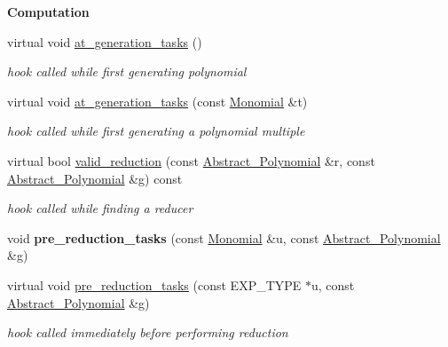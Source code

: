 \begin{Indent}\textbf{ Computation}\par
\begin{DoxyCompactItemize}
\item 
virtual void \hyperlink{group__strategygroup_a3c2e31f0e3323da59564edc6ee3557af}{at\+\_\+generation\+\_\+tasks} ()
\begin{DoxyCompactList}\small\item\em hook called while first generating polynomial \end{DoxyCompactList}\item 
virtual void \hyperlink{group__strategygroup_a6683749a5fb30b6f91075a28899fbfe7}{at\+\_\+generation\+\_\+tasks} (const \hyperlink{group__polygroup_class_monomial}{Monomial} \&t)
\begin{DoxyCompactList}\small\item\em hook called while first generating a polynomial {\itshape multiple} \end{DoxyCompactList}\item 
virtual bool \hyperlink{group__strategygroup_a996754ff163b0ff32d783ec723ac35be}{valid\+\_\+reduction} (const \hyperlink{group__polygroup_class_abstract___polynomial}{Abstract\+\_\+\+Polynomial} \&r, const \hyperlink{group__polygroup_class_abstract___polynomial}{Abstract\+\_\+\+Polynomial} \&g) const
\begin{DoxyCompactList}\small\item\em hook called while finding a reducer \end{DoxyCompactList}\item 
\mbox{\label{group__strategygroup_a27fb1565f1c569ca28f01021551a1353}} 
void {\bfseries pre\+\_\+reduction\+\_\+tasks} (const \hyperlink{group__polygroup_class_monomial}{Monomial} \&u, const \hyperlink{group__polygroup_class_abstract___polynomial}{Abstract\+\_\+\+Polynomial} \&g)
\item 
virtual void \hyperlink{group__strategygroup_a0d71db50c58a24f48f94eae6a48c2149}{pre\+\_\+reduction\+\_\+tasks} (const E\+X\+P\+\_\+\+T\+Y\+PE $\ast$u, const \hyperlink{group__polygroup_class_abstract___polynomial}{Abstract\+\_\+\+Polynomial} \&g)
\begin{DoxyCompactList}\small\item\em hook called immediately before performing reduction \end{DoxyCompactList}\end{DoxyCompactItemize}
\end{Indent}
